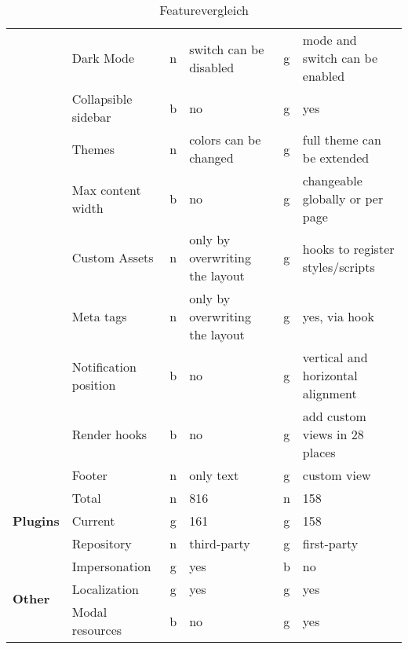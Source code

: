 \begin{table}[h!]
{\begin{tabular}{llclcl}
            & Dark Mode              & n           & switch can be disabled          & g           & mode and switch can be enabled           \\
            & Collapsible sidebar    & b           & no                              & g           & yes                                      \\
            & Themes                 & n           & colors can be changed           & g           & full theme can be extended               \\
            & Max content width      & b           & no                              & g           & changeable globally or per page          \\
            & Custom Assets          & n           & only by overwriting the layout  & g           & hooks to register styles/scripts         \\
            & Meta tags              & n           & only by overwriting the layout  & g           & yes, via hook                            \\
            & Notification position  & b           & no                              & g           & vertical and horizontal alignment        \\
            & Render hooks           & b           & no                              & g           & add custom views in 28 places            \\
            & Footer                 & n           & only text                       & g           & custom view                              \\
            \hline
            \multirow{3}{*}{\textbf{Plugins}}        & Total                  & n           & 816                             & n           & 158                                      \\
            & Current                & g           & 161                             & g           & 158                                      \\
            & Repository             & n           & third-party\cite{nova-packages} & g           & first-party\cite{filament-plugins}       \\
            \hline
            \multirow{3}{*}{\textbf{Other}}          & Impersonation          & g           & yes                             & b           & no                                       \\
            & Localization           & g           & yes                             & g           & yes                                      \\
            & Modal resources        & b           & no                              & g           & yes
        \end{tabular}%
    }
    \caption{Featurevergleich}
\end{table}
